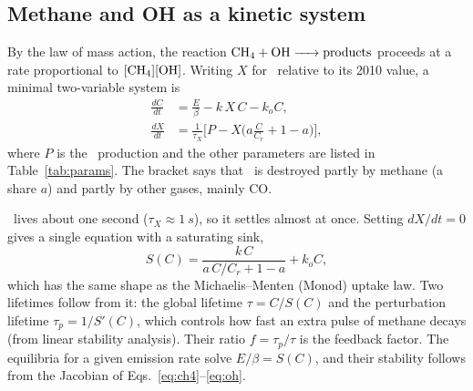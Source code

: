 \documentclass[11pt,a4paper]{article}
\newcommand{\CH}{\ce{CH4}}
\newcommand{\OH}{\ce{OH}}
\begin{document}
\subsection{Methane and OH as a kinetic system}
By the law of mass action, the reaction $\ce{CH4 + OH -> products}$ proceeds at a rate proportional to $[\CH][\OH]$. Writing $X$ for \OH\ relative to its 2010 value, a minimal two-variable system is
\begin{align}
\frac{dC}{dt}&=\frac{E}{\beta}-k\,X\,C-k_oC, \label{eq:ch4}\\
\frac{dX}{dt}&=\frac{1}{\tau_X}\Big[P-X\Big(a\frac{C}{C_r}+1-a\Big)\Big], \label{eq:oh}
\end{align}
where $P$ is the \OH\ production and the other parameters are listed in Table~\ref{tab:params}. The bracket says that \OH\ is destroyed partly by methane (a share $a$) and partly by other gases, mainly CO.

\OH\ lives about one second ($\tau_X\approx\SI{1}{s}$), so it settles almost at once. Setting $dX/dt=0$ gives a single equation with a saturating sink,
\begin{equation}
S(C)=\frac{k\,C}{a\,C/C_r+1-a}+k_oC,
\label{eq:sink}
\end{equation}
which has the same shape as the Michaelis--Menten (Monod) uptake law. Two lifetimes follow from it: the global lifetime $\tau=C/S(C)$ and the perturbation lifetime $\tau_p=1/S'(C)$, which controls how fast an extra pulse of methane decays (from linear stability analysis). Their ratio $f=\tau_p/\tau$ is the feedback factor. The equilibria for a given emission rate solve $E/\beta=S(C)$, and their stability follows from the Jacobian of Eqs.~\eqref{eq:ch4}--\eqref{eq:oh}.
\end{document}
